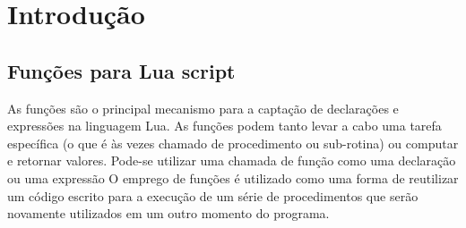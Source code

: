 \section{Introdução}
\label{cap3:introducao}

\subsection{Funções para Lua script}
As funções são o principal mecanismo para a captação de declarações e expressões na linguagem Lua.
%
As funções podem tanto levar a cabo uma tarefa específica (o que é às vezes chamado de procedimento ou sub-rotina) ou computar e retornar valores. Pode-se utilizar uma chamada de função como uma declaração ou uma expressão
%
O emprego de funções é utilizado como uma forma de reutilizar um código escrito para a execução de um série de procedimentos que serão novamente utilizados em um outro momento do programa.
